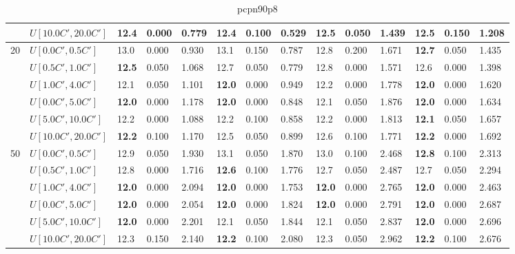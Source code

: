 \begin{table}[h]
{\begin{tabular}{|l|l||l|l|l||l|l|l||l|l|l||l|l|l|}
       & $U[10.0C',20.0C']$ & \textbf{12.4} & 0.000 & 0.779 & \textbf{12.4} & 0.100 & 0.529 & 12.5 & 0.050 & 1.439 & 12.5 & 0.150 & 1.208 \\
      \hline\hline
      \multirow{6}{*}{20} & $U[0.0C',0.5C']$ & 13.0 & 0.000 & 0.930 & 13.1 & 0.150 & 0.787 & 12.8 & 0.200 & 1.671 & \textbf{12.7} & 0.050 & 1.435 \\
       & $U[0.5C',1.0C']$ & \textbf{12.5} & 0.050 & 1.068 & 12.7 & 0.050 & 0.779 & 12.8 & 0.000 & 1.571 & 12.6 & 0.000 & 1.398 \\
       & $U[1.0C',4.0C']$ & 12.1 & 0.050 & 1.101 & \textbf{12.0} & 0.000 & 0.949 & 12.2 & 0.000 & 1.778 & \textbf{12.0} & 0.000 & 1.620 \\
       & $U[0.0C',5.0C']$ & \textbf{12.0} & 0.000 & 1.178 & \textbf{12.0} & 0.000 & 0.848 & 12.1 & 0.050 & 1.876 & \textbf{12.0} & 0.000 & 1.634 \\
       & $U[5.0C',10.0C']$ & 12.2 & 0.000 & 1.088 & 12.2 & 0.100 & 0.858 & 12.2 & 0.000 & 1.813 & \textbf{12.1} & 0.050 & 1.657 \\
       & $U[10.0C',20.0C']$ & \textbf{12.2} & 0.100 & 1.170 & 12.5 & 0.050 & 0.899 & 12.6 & 0.100 & 1.771 & \textbf{12.2} & 0.000 & 1.692 \\
      \hline\hline
      \multirow{6}{*}{50} & $U[0.0C',0.5C']$ & 12.9 & 0.050 & 1.930 & 13.1 & 0.050 & 1.870 & 13.0 & 0.100 & 2.468 & \textbf{12.8} & 0.100 & 2.313 \\
       & $U[0.5C',1.0C']$ & 12.8 & 0.000 & 1.716 & \textbf{12.6} & 0.100 & 1.776 & 12.7 & 0.050 & 2.487 & 12.7 & 0.050 & 2.294 \\
       & $U[1.0C',4.0C']$ & \textbf{12.0} & 0.000 & 2.094 & \textbf{12.0} & 0.000 & 1.753 & \textbf{12.0} & 0.000 & 2.765 & \textbf{12.0} & 0.000 & 2.463 \\
       & $U[0.0C',5.0C']$ & \textbf{12.0} & 0.000 & 2.054 & \textbf{12.0} & 0.000 & 1.824 & \textbf{12.0} & 0.000 & 2.791 & \textbf{12.0} & 0.000 & 2.687 \\
       & $U[5.0C',10.0C']$ & \textbf{12.0} & 0.000 & 2.201 & 12.1 & 0.050 & 1.844 & 12.1 & 0.050 & 2.837 & \textbf{12.0} & 0.000 & 2.696 \\
       & $U[10.0C',20.0C']$ & 12.3 & 0.150 & 2.140 & \textbf{12.2} & 0.100 & 2.080 & 12.3 & 0.050 & 2.962 & \textbf{12.2} & 0.100 & 2.676 \\
      \hline
      \end{tabular}
      }
      \caption{pcpn90p8}
      \label{tab:pcpn90p8}\end{table}
      
